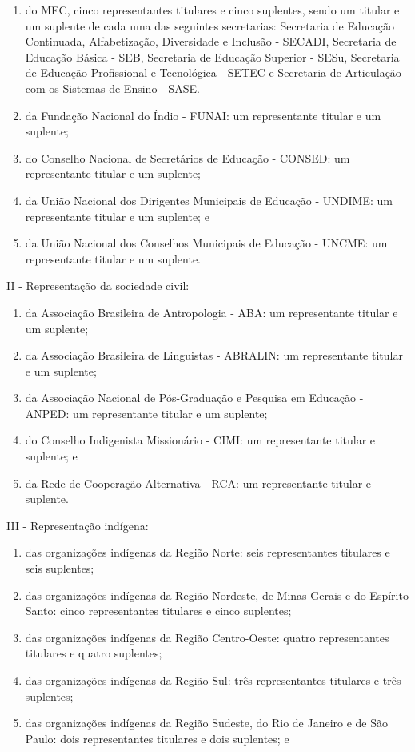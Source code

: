 \documentclass[
]{book}
\begin{document}
\begin{enumerate}
\def\labelenumi{\alph{enumi})}
\item
  do MEC, cinco representantes titulares e cinco suplentes, sendo um titular e um suplente de cada uma das seguintes secretarias: Secretaria de Educação Continuada, Alfabetização, Diversidade e Inclusão - SECADI, Secretaria de Educação Básica - SEB, Secretaria de Educação Superior - SESu, Secretaria de Educação Profissional e Tecnológica - SETEC e Secretaria de Articulação com os Sistemas de Ensino - SASE.
\item
  da Fundação Nacional do Índio - FUNAI: um representante titular e um suplente;
\item
  do Conselho Nacional de Secretários de Educação - CONSED: um representante titular e um suplente;
\item
  da União Nacional dos Dirigentes Municipais de Educação - UNDIME: um representante titular e um suplente; e
\item
  da União Nacional dos Conselhos Municipais de Educação - UNCME: um representante titular e um suplente.
\end{enumerate}

II - Representação da sociedade civil:

\begin{enumerate}
\def\labelenumi{\alph{enumi})}
\item
  da Associação Brasileira de Antropologia - ABA: um representante titular e um suplente;
\item
  da Associação Brasileira de Linguistas - ABRALIN: um representante titular e um suplente;
\item
  da Associação Nacional de Pós-Graduação e Pesquisa em Educação - ANPED: um representante titular e um suplente;
\item
  do Conselho Indigenista Missionário - CIMI: um representante titular e suplente; e
\item
  da Rede de Cooperação Alternativa - RCA: um representante titular e suplente.
\end{enumerate}

III - Representação indígena:

\begin{enumerate}
\def\labelenumi{\alph{enumi})}
\item
  das organizações indígenas da Região Norte: seis representantes titulares e seis suplentes;
\item
  das organizações indígenas da Região Nordeste, de Minas Gerais e do Espírito Santo: cinco representantes titulares e cinco suplentes;
\item
  das organizações indígenas da Região Centro-Oeste: quatro representantes titulares e quatro suplentes;
\item
  das organizações indígenas da Região Sul: três representantes titulares e três suplentes;
\item
  das organizações indígenas da Região Sudeste, do Rio de Janeiro e de São Paulo: dois representantes titulares e dois suplentes; e
\end{enumerate}
\end{document}
